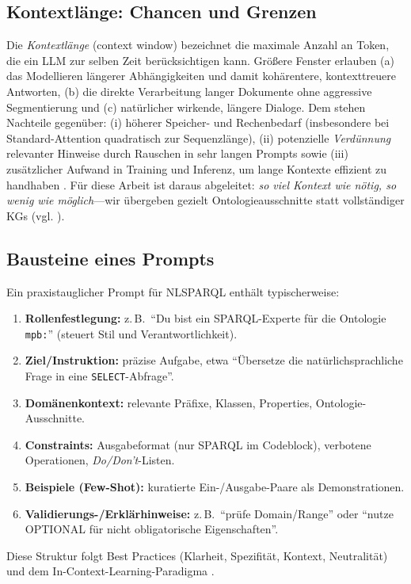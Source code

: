 \subsection{Kontextlänge: Chancen und Grenzen}
Die \emph{Kontextlänge} (context window) bezeichnet die maximale Anzahl an Token, die ein LLM zur selben Zeit berücksichtigen kann. Größere Fenster erlauben (a) das Modellieren längerer Abhängigkeiten und damit kohärentere, kontexttreuere Antworten, (b) die direkte Verarbeitung langer Dokumente ohne aggressive Segmentierung und (c) natürlicher wirkende, längere Dialoge. Dem stehen Nachteile gegenüber: (i) höherer Speicher- und Rechenbedarf (insbesondere bei Standard-Attention quadratisch zur Sequenzlänge), (ii) potenzielle \emph{Verdünnung} relevanter Hinweise durch Rauschen in sehr langen Prompts sowie (iii) zusätzlicher Aufwand in Training und Inferenz, um lange Kontexte effizient zu handhaben \cite{campesatoLLMIntro}. Für diese Arbeit ist daraus abgeleitet: \emph{so viel Kontext wie nötig, so wenig wie möglich}—wir übergeben gezielt Ontologieausschnitte statt vollständiger KGs (vgl. \cite{avila2024text2sparql}).

\subsection{Bausteine eines Prompts}
Ein praxistauglicher Prompt für NL{\textrightarrow}SPARQL enthält typischerweise:
\begin{enumerate}
  \item \textbf{Rollenfestlegung:} z.\,B.\ \enquote{Du bist ein SPARQL-Experte für die Ontologie \texttt{mpb:}} (steuert Stil und Verantwortlichkeit).
  \item \textbf{Ziel/Instruktion:} präzise Aufgabe, etwa \enquote{Übersetze die natürlichsprachliche Frage in eine \texttt{SELECT}-Abfrage}. 
  \item \textbf{Domänenkontext:} relevante Präfixe, Klassen, Properties, Ontologie-Ausschnitte.
  \item \textbf{Constraints:} Ausgabeformat (nur SPARQL im Codeblock), verbotene Operationen, \emph{Do/Don't}-Listen.
  \item \textbf{Beispiele (Few-Shot):} kuratierte Ein-/Ausgabe-Paare als Demonstrationen.
  \item \textbf{Validierungs-/Erklärhinweise:} z.\,B.\ \enquote{prüfe Domain/Range} oder \enquote{nutze OPTIONAL für nicht obligatorische Eigenschaften}.
\end{enumerate}
Diese Struktur folgt Best Practices (Klarheit, Spezifität, Kontext, Neutralität) \cite{tabatabaianPromptBook,campesatoLLMIntro} und dem In-Context-Learning-Paradigma \cite{brown2020language}.

